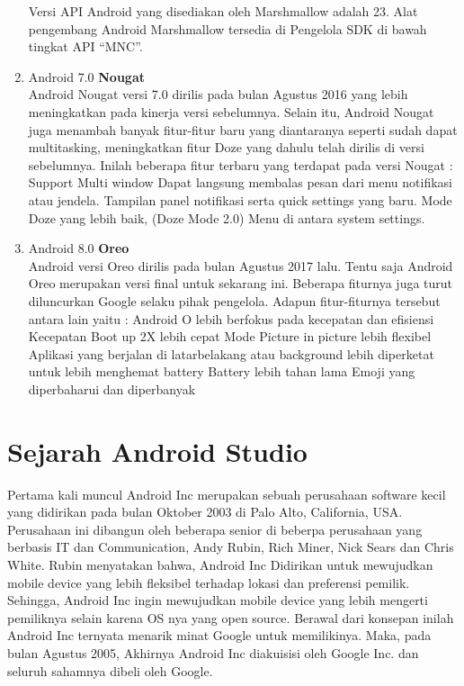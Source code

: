 \begin{enumerate}
Versi API Android yang disediakan oleh Marshmallow adalah 23. Alat pengembang Android Marshmallow tersedia di Pengelola SDK di bawah tingkat API “MNC”.

\item Android 7.0 \textbf{Nougat}\\
Android Nougat versi 7.0 dirilis pada bulan Agustus 2016 yang lebih meningkatkan pada kinerja versi sebelumnya. Selain itu, Android Nougat juga menambah banyak fitur-fitur baru yang diantaranya seperti sudah dapat multitasking, meningkatkan fitur Doze yang dahulu telah dirilis di versi sebelumnya. Inilah beberapa fitur terbaru yang terdapat pada versi Nougat :
Support Multi window
Dapat langsung membalas pesan dari menu notifikasi atau jendela.
Tampilan panel notifikasi serta quick settings yang baru.
Mode Doze yang lebih baik, (Doze Mode 2.0)
Menu di antara system settings.

\item Android 8.0 \textbf{Oreo}\\
Android versi Oreo dirilis pada bulan Agustus 2017 lalu. Tentu saja Android Oreo merupakan versi final untuk sekarang ini. Beberapa fiturnya juga turut diluncurkan Google selaku pihak pengelola. Adapun fitur-fiturnya tersebut antara lain yaitu :
Android O lebih berfokus pada kecepatan dan efisiensi
Kecepatan Boot up 2X lebih cepat
Mode Picture in picture lebih flexibel
Aplikasi yang berjalan di latarbelakang atau background lebih diperketat untuk lebih menghemat battery
Battery lebih tahan lama
Emoji yang diperbaharui dan diperbanyak

\end{enumerate}

\section{ Sejarah Android Studio}
Pertama kali muncul Android Inc merupakan sebuah perusahaan software kecil yang didirikan pada bulan Oktober 2003 di Palo Alto, California, USA. Perusahaan ini dibangun oleh beberapa senior di beberpa perusahaan yang berbasis IT dan Communication, Andy Rubin, Rich Miner, Nick Sears dan Chris White. Rubin menyatakan bahwa, Android Inc Didirikan untuk mewujudkan mobile device yang lebih fleksibel terhadap lokasi dan preferensi pemilik. Sehingga, Android Inc ingin mewujudkan mobile device yang lebih mengerti pemiliknya selain karena OS nya yang open source. Berawal dari konsepan inilah Android Inc ternyata menarik minat Google untuk memilikinya. Maka, pada bulan Agustus 2005, Akhirnya Android Inc diakuisisi oleh Google Inc. dan seluruh sahamnya dibeli oleh Google.

